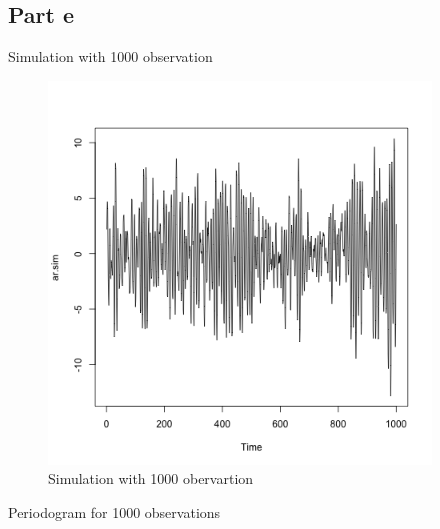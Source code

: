 \documentclass[11pt, oneside]{article}   	%
\begin{document}
\subsection{Part e}
Simulation with 1000 observation

\begin{figure}[H] %
   \centering
   \includegraphics[width=4in]{../code/simulation1000.png} 
   \caption{Simulation with 1000 obervartion}
   \label{fig:sim1000}
\end{figure}
Periodogram for 1000 observations  
\end{document}
